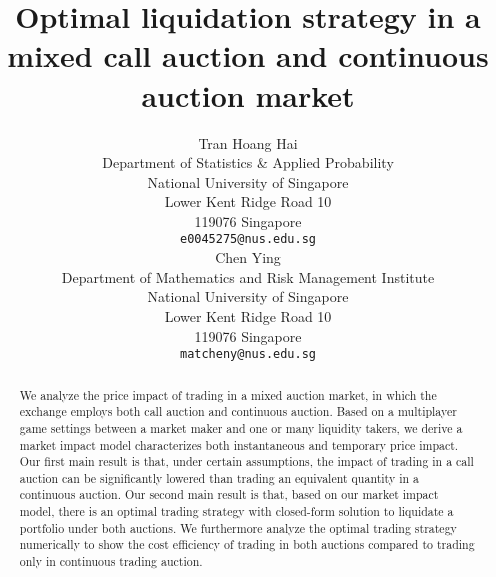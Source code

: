 \documentclass{article}
\title{Optimal liquidation strategy in a mixed call auction and continuous auction market}
\author{
 Tran Hoang Hai \\
 Department of Statistics \& Applied Probability\\
 National University of Singapore \\
 Lower Kent Ridge Road 10 \\
 119076 Singapore \\
 \texttt{e0045275@nus.edu.sg} \\
   \And
 Chen Ying \\
 Department of Mathematics and Risk Management Institute \\
 National University of Singapore \\
 Lower Kent Ridge Road 10 \\
 119076 Singapore \\
 \texttt{matcheny@nus.edu.sg} \\
}
\begin{document}
\maketitle

\begin{abstract}
  We analyze the price impact of trading in a mixed auction market, in which the exchange employs both call auction and continuous auction. Based on a multiplayer game settings between a market maker and one or many liquidity takers, we derive a market impact model characterizes both instantaneous and temporary price impact. Our first main result is that, under certain assumptions, the impact of trading in a call auction can be significantly lowered than trading an equivalent quantity in a continuous auction. Our second main result is that, based on our market impact model, there is an optimal trading strategy with closed-form solution to liquidate a portfolio under both auctions. We furthermore analyze the optimal trading strategy numerically to show the cost efficiency of trading in both auctions compared to trading only in continuous trading auction.
\end{abstract}
\end{document}
